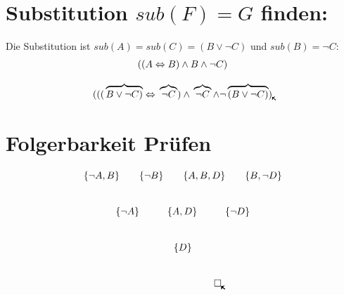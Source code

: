 \documentclass{article}
\newcommand{\tikzmark}[1]{\tikz[baseline,remember picture] \coordinate (#1) {};}
\newcommand{\tikznode}[2]{\tikz[remember picture] \coordinate (#1)++(#2,-1.5em) {};}
\newcommand{\tikznodes}[3]{\tikz[remember picture] \coordinate (#1)++(#3++0.5em,-1em){}; \tikz[remember picture]\coordinate (#2)++(#3++-0.5em,-1em) {};}
\begin{document}
	\section{Substitution $sub(F)=G$ finden:}
	Die Substitution ist $sub(A)=sub(C)=(B\vee \neg C)$ und $sub(B)=\neg C$:
	\begin{gather*}  
		((\tikzmark{a}A\Leftrightarrow \tikzmark{b}B)\wedge \tikzmark{c}B\wedge \neg \tikzmark{d}C)\\[2ex]
		(((\tikznode{e}{-2.05em}\overbrace{B\vee \neg C)}\Leftrightarrow \tikznode{f}{-1em}\overbrace{\neg C})\wedge \tikznode{g}{-1em}\overbrace{\neg C} \wedge \neg\tikznode{h}{-2.1em}\overbrace{(B\vee \neg C)})
		\tikz[remember picture,overlay]
		{
			\draw[->] (a.south)++(.35em,-.65ex) to (e.north) ;
			\draw[->] (b.south)++(.35em,-.65ex) to (f.north) ;
			\draw[->] (c.south)++(.35em,-.65ex) to (g.north) ;
			\draw[->] (d.south)++(.35em,-.65ex) to (h.north) ;
		}  
	\end{gather*}
	\section{Folgerbarkeit Prüfen}
	\begin{gather*}
		\{\neg A\tikzmark{nab}, B\}\qquad
		\{\neg \tikzmark{nb}B\}\qquad
		\{A,\tikzmark{abd}B,D\}\qquad
		\{B\tikzmark{bnd},\neg D\}
		\\[5ex]
		\hspace*{1cm}\tikznodes{-na1}{-na2}{-0.4cm}\{\neg \tikzmark{na}A\}
		\hspace*{1cm} \tikznodes{-ad1}{-ad2}{-0.65cm}\{A\tikzmark{ad}, D\}
		\hspace*{1cm} \{\neg \tikznodes{-nd1}{-nd2}{0cm}\tikzmark{nd}D\}
		\hspace*{1cm}
		\\[5ex]
		\{\tikznodes{-d1}{-d2}{0cm}\tikzmark{d}D\}
		\\[5ex]
		\hspace*{2.5cm}\tikznode{-sq1}{-0.05cm}\tikznode{-sq2}{-0.2cm}\square
		\tikz[remember picture,overlay]
		{
			\draw[->] (nab.south)++(.35em,-.65ex) to (-na1.north) ;
			\draw[->] (nb.south)++(.35em,-.65ex) to (-na2.north) ;
			\draw[->] (nb.south)++(.35em,-.65ex) to (-ad1.north) ;
			\draw[->] (abd.south)++(.35em,-.65ex) to (-ad2.north) ;
			\draw[->] (abd.south)++(.35em,-.65ex) to (-nd1.north) ;
			\draw[->] (bnd.south)++(.35em,-.65ex) to (-nd2.north) ;
			\draw[->] (na.south)++(.35em,-.65ex) to (-d1.north) ;
			\draw[->] (ad.south)++(.35em,-.65ex) to (-d2.north) ;			
			\draw[->] (nd.south)++(.35em,-.65ex) to (-sq2.north) ;
			\draw[->] (d.south)++(.35em,-.65ex) to (-sq1.north) ;
		}  
	\end{gather*}
\end{document}
